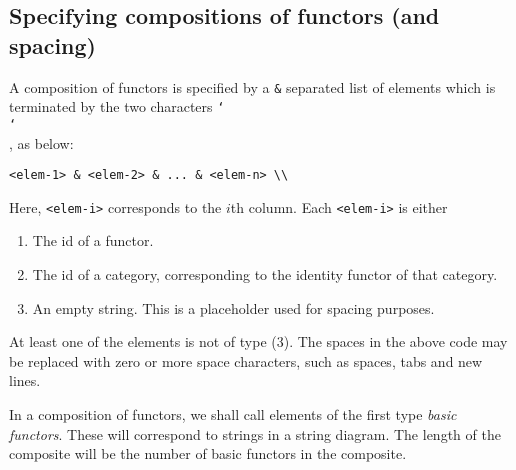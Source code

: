 \documentclass{amsart}
\newcommand{\vlength}{0.2cm}
\begin{document}
\subsection{Specifying compositions of functors (and spacing)} \label{specifying-func-comp}
A composition of functors is specified by a \texttt{\&} separated list of elements
    which is terminated by the two characters \texttt{\char`\\}\texttt{\char`\\}, as below:
\vspace{\vlength}
\begin{verbatim}
<elem-1> & <elem-2> & ... & <elem-n> \\
\end{verbatim}
\vspace{\vlength}
Here, \texttt{<elem-i>} corresponds to the $i$th column.
Each \texttt{<elem-i>} is either
\begin{enumerate}
    \item The id of a functor.
    \item The id of a category, corresponding to the identity functor of that category.
    \item An empty string. 
        This is a placeholder used for spacing purposes.
\end{enumerate}
At least one of the elements is not of type (3).
The spaces in the above code may be replaced with zero or more space characters,
    such as spaces, tabs and new lines.

In a composition of functors, we shall call elements of the first type \emph{basic functors}.
These will correspond to strings in a string diagram.
The length of the composite will be the number of basic functors in the composite.
\end{document}
